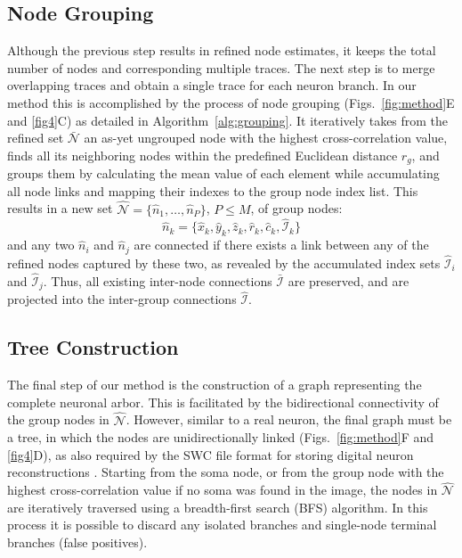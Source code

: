 \subsection{Node Grouping}
\label{subsec:node-grouping}
Although the previous step results in refined node estimates, it keeps the total number of nodes and corresponding multiple traces. The next step is to merge overlapping traces and obtain a single trace for each neuron branch. In our method this is accomplished by the process of node grouping (Figs.~\ref{fig:method}E and \ref{fig4}C) as detailed in Algorithm~\ref{alg:grouping}. It iteratively takes from the refined set $\bar{\mathcal{N}}$ an as-yet ungrouped node with the highest cross-correlation value, finds all its neighboring nodes within the predefined Euclidean distance $r_g$, and groups them by calculating the mean value of each element while accumulating all node links and mapping their indexes to the group node index list. This results in a new set $\hat{\mathcal{N}} = \lbrace \hat{n}_1,\dots,\hat{n}_P \rbrace$, $P \leq M$, of group nodes:
\begin{equation}
\label{eq:hat_n_k}
\hat{n}_k=\lbrace\hat{x}_k, \hat{y}_k, \hat{z}_k, \hat{r}_k, \hat{c}_k, \hat{\mathcal{I}}_k\rbrace
\end{equation}
and any two $\hat{n}_i$ and $\hat{n}_j$ are connected if there exists a link between any of the refined nodes captured by these two, as revealed by the accumulated index sets $\hat{\mathcal{I}}_i$ and $\hat{\mathcal{I}}_j$. Thus, all existing inter-node connections $\bar{\mathcal{I}}$ are preserved, and are projected into the inter-group connections $\hat{\mathcal{I}}$.

\subsection{Tree Construction}
\label{subsec:tree-construction}
The final step of our method is the construction of a graph representing the complete neuronal arbor. This is facilitated by the bidirectional connectivity of the group nodes in $\hat{\mathcal{N}}$. However, similar to a real neuron, the final graph must be a tree, in which the nodes are unidirectionally linked (Figs.~\ref{fig:method}F and \ref{fig4}D), as also required by the SWC file format for storing digital neuron reconstructions \cite{stockley1993system, cannon1998line}. Starting from the soma node, or from the group node with the highest cross-correlation value if no soma was found in the image, the nodes in $\hat{\mathcal{N}}$ are iteratively traversed using a breadth-first search (BFS) algorithm. In this process it is possible to discard any isolated branches and single-node terminal branches (false positives).

